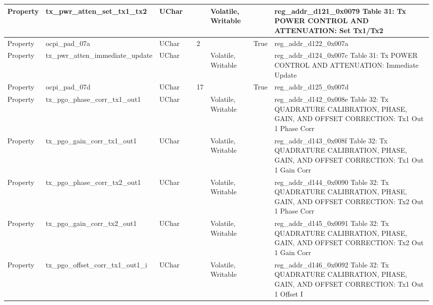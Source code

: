 \documentclass{article}
\begin{document}
\begin{scriptsize}
\begin{longtable}{|p{2cm}|p{5cm}|p{1cm}|p{2cm}|p{2cm}|p{1.75cm}|p{1.5cm}|p{5.1cm}|}
  \hline
  Property & tx\_pwr\_atten\_set\_tx1\_tx2                            & UChar &                  &                  & Volatile,  Writable &         & reg\_addr\_d121\_0x0079 Table 31: Tx POWER CONTROL AND ATTENUATION: Set Tx1/Tx2 \\
  \hline
  Property & ocpi\_pad\_07a                                           & UChar &                  & 2                &                     & True    & reg\_addr\_d122\_0x007a \\
  \hline
  Property & tx\_pwr\_atten\_immediate\_update                        & UChar &                  &                  & Volatile,  Writable &         & reg\_addr\_d124\_0x007c Table 31: Tx POWER CONTROL AND ATTENUATION: Immediate Update \\
  \hline
  Property & ocpi\_pad\_07d                                           & UChar &                  & 17               &                     & True    & reg\_addr\_d125\_0x007d \\
  \hline
  Property & tx\_pgo\_phase\_corr\_tx1\_out1                          & UChar &                  &                  & Volatile,  Writable &         & reg\_addr\_d142\_0x008e Table 32: Tx QUADRATURE CALIBRATION, PHASE, GAIN, AND OFFSET CORRECTION: Tx1 Out 1 Phase Corr \\
  \hline
  Property & tx\_pgo\_gain\_corr\_tx1\_out1                           & UChar &                  &                  & Volatile,  Writable &         & reg\_addr\_d143\_0x008f Table 32: Tx QUADRATURE CALIBRATION, PHASE, GAIN, AND OFFSET CORRECTION: Tx1 Out 1 Gain Corr \\
  \hline
  Property & tx\_pgo\_phase\_corr\_tx2\_out1                          & UChar &                  &                  & Volatile,  Writable &         & reg\_addr\_d144\_0x0090 Table 32: Tx QUADRATURE CALIBRATION, PHASE, GAIN, AND OFFSET CORRECTION: Tx2 Out 1 Phase Corr \\
  \hline
  Property & tx\_pgo\_gain\_corr\_tx2\_out1                           & UChar &                  &                  & Volatile,  Writable &         & reg\_addr\_d145\_0x0091 Table 32: Tx QUADRATURE CALIBRATION, PHASE, GAIN, AND OFFSET CORRECTION: Tx2 Out 1 Gain Corr \\
  \hline
  Property & tx\_pgo\_offset\_corr\_tx1\_out1\_i                      & UChar &                  &                  & Volatile,  Writable &         & reg\_addr\_d146\_0x0092 Table 32: Tx QUADRATURE CALIBRATION, PHASE, GAIN, AND OFFSET CORRECTION: Tx1 Out 1 Offset I \\

\end{longtable}
\end{scriptsize}
\end{document}
